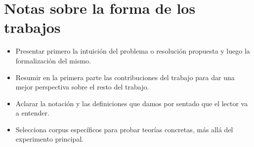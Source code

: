 \documentclass[11pt,spanish]{article}
\begin{document}
\section{Notas sobre la forma de los trabajos}
\begin{itemize}
    \item Presentar primero la intuición del problema o resolución propuesta y luego la formalización del mismo.
    \item Resumir en la primera parte las contribuciones del trabajo para dar una mejor perspectiva sobre el resto del trabajo.
    \item Aclarar la notación y las definiciones que damos por sentado que el lector va a entender.
    \item Selecciona corpus específicos para probar teorías concretas, más allá del experimento principal.
\end{itemize}
\end{document}
